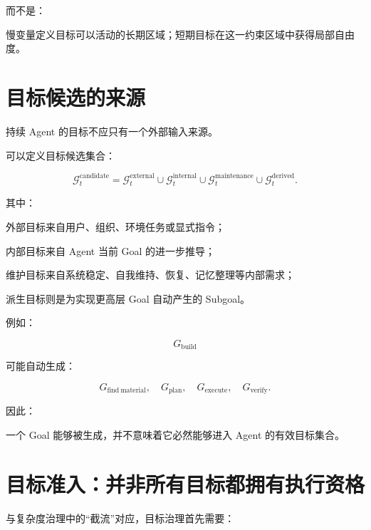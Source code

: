 而不是：

\begin{statementbox}
\centering
{}
\end{statementbox}

慢变量定义目标可以活动的长期区域；短期目标在这一约束区域中获得局部自由度。


\section{目标候选的来源}

持续 Agent 的目标不应只有一个外部输入来源。

可以定义目标候选集合：

\[
\mathcal G^{\mathrm{candidate}}_t
=
\mathcal G^{\mathrm{external}}_t
\cup
\mathcal G^{\mathrm{internal}}_t
\cup
\mathcal G^{\mathrm{maintenance}}_t
\cup
\mathcal G^{\mathrm{derived}}_t.
\]

其中：

外部目标来自用户、组织、环境任务或显式指令；

内部目标来自 Agent 当前 Goal 的进一步推导；

维护目标来自系统稳定、自我维持、恢复、记忆整理等内部需求；

派生目标则是为实现更高层 Goal 自动产生的 Subgoal。

例如：

\[
G_{\mathrm{build}}
\]

可能自动生成：

\[
G_{\mathrm{find\ material}},
\quad
G_{\mathrm{plan}},
\quad
G_{\mathrm{execute}},
\quad
G_{\mathrm{verify}}.
\]

因此：

\begin{statementbox}
\centering
{}
\end{statementbox}

一个 Goal 能够被生成，并不意味着它必然能够进入 Agent 的有效目标集合。


\section{目标准入：并非所有目标都拥有执行资格}

与复杂度治理中的``截流''对应，目标治理首先需要：

\begin{statementbox}
\centering
{}
\end{statementbox}

